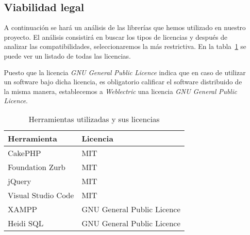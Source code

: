 \subsection{Viabilidad legal}

A continuación se hará un análisis de las librerías que hemos utilizado en nuestro proyecto. El análisis consistirá en buscar los tipos de licencias y después de analizar las compatibilidades, seleccionaremos la más restrictiva. En la tabla~\ref{tabla:licencias} se puede ver un listado de todas las licencias.

Puesto que la licencia \textit{GNU General Public Licence} indica que en caso de utilizar un software bajo dicha licencia, es obligatorio calificar el software distribuido de la misma manera, establecemos a \textit{Weblectric} una licencia \textit{GNU General Public Licence}.

\begin{table}[h]
	\centering
	\caption{Herramientas utilizadas y sus licencias}
	\label{tabla:licencias}
	\begin{tabular}{p{4cm} p{6cm}}
		\toprule
		Herramienta & Licencia \\ \midrule
		CakePHP				         & MIT   								\\
		Foundation Zurb		         & MIT   								\\
		jQuery				         & MIT   								\\
		Visual Studio Code 			 & MIT 									\\ 
		XAMPP				         & GNU General Public Licence   		\\ 
		Heidi SQL					 & GNU General Public Licence			\\ \bottomrule
	\end{tabular}
\end{table}


